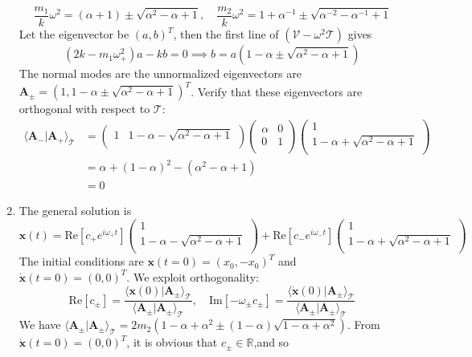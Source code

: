 \documentclass[a4paper]{article}
\begin{document}
\begin{ans}
\begin{enumerate}[label=(\roman*)]
$$\frac{m_1}{k}\omega^2=(\alpha+1)\pm\sqrt{\alpha^2-\alpha+1}, \quad \frac{m_2}{k}\omega^2=1+\alpha^{-1}\pm\sqrt{\alpha^{-2}-\alpha^{-1}+1}$$
Let the eigenvector be $(a,b)^T$, then the first line of $(\mathcal{V}-\omega^2\mathcal{T})$ gives $$(2k-m_1\omega_+^2)a-kb=0\implies b=a(1-\alpha\pm\sqrt{\alpha^2-\alpha+1})$$ The normal modes are the unnormalized eigenvectors are $\mathbf{A_\pm}=(1,1-\alpha\pm\sqrt{\alpha^2-\alpha+1})^T$. Verify that these eigenvectors are orthogonal with respect to $\mathcal{T}$:
\begin{align}
\langle\mathbf{A_-}|\mathbf{A_+}\rangle_{\mathcal{T}}&=\begin{pmatrix}1&1-\alpha-\sqrt{\alpha^2-\alpha+1}\\\end{pmatrix}\begin{pmatrix}\alpha&0\\0&1\\\end{pmatrix}\begin{pmatrix}1\\1-\alpha+\sqrt{\alpha^2-\alpha+1}\\\end{pmatrix}\nonumber\\&=\alpha+(1-\alpha)^2-(\alpha^2-\alpha+1)\nonumber\\&=0\nonumber
\end{align}
\item The general solution is
$$\mathbf{x}(t)=\text{Re}[c_+e^{i\omega_+t}]\begin{pmatrix}1\\1-\alpha-\sqrt{\alpha^2-\alpha+1}\\\end{pmatrix}+\text{Re}[c_-e^{i\omega_-t}]\begin{pmatrix}1\\1-\alpha+\sqrt{\alpha^2-\alpha+1}\\\end{pmatrix}$$
The initial conditions are $\mathbf{x}(t=0)=(x_0,-x_0)^T$ and $\mathbf{\dot{x}}(t=0)=(0,0)^T$. We exploit orthogonality:
\begin{equation}
  \text{Re}[c_\pm]=\frac{\langle\mathbf{x}(0)|\mathbf{A_\pm}\rangle_{\mathcal{T}}}{\langle\mathbf{A_\pm}|\mathbf{A_\pm}\rangle_{\mathcal{T}}},\quad \text{Im}[-\omega_\pm c_\pm]=\frac{\langle\mathbf{\dot{x}}(0)|\mathbf{A_\pm}\rangle_{\mathcal{T}}}{\langle\mathbf{A_\pm}|\mathbf{A_\pm}\rangle_\mathcal{T}}\nonumber
\end{equation}
We have $\langle\mathbf{A}_\pm|\mathbf{A}_\pm\rangle_{\mathcal{T}}=2m_2(1-\alpha+\alpha^2\pm(1-\alpha)\sqrt{1-\alpha+\alpha^2})$. From $\mathbf{\dot{x}}(t=0)=(0,0)^T$, it is obvious that $c_\pm\in\mathbb{R}$,and so

\end{enumerate}
\end{ans}
\end{document}
